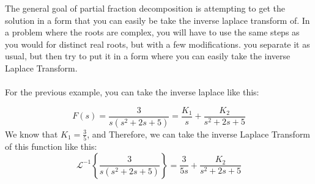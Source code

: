 \documentclass{article}
\theoremstyle{mytheoremstyle}
\theoremstyle{mytheoremstyle}
\theoremstyle{myproblemstyle}
\theoremstyle{break}
\newcommand{\LaplaceInverse}{\mathscr{L}^{-1}}
\begin{document}
The general goal of partial fraction decomposition is attempting to get the solution in a form that you can easily be take the inverse laplace transform of. In a problem where the roots are complex, you will have to use the same steps as you would for distinct real roots, but with a few modifications. you separate it as usual, but then try to put it in a form where you can easily take the inverse Laplace Transform.\\\\
For the previous example, you can take the inverse laplace like this:

\begin{equation}
	F(s) = \frac{3}{s(s^2 + 2s + 5)} = \frac{K_1}{s} + \frac{K_2}{s^2 + 2s + 5}
\end{equation}
We know that $K_1 = \frac{3}{5}$, and Therefore, we can take the inverse Laplace Transform of this function like this:
\begin{equation}
	\LaplaceInverse\left\{\frac{3}{s(s^2 + 2s + 5)}\right\} = \frac{3}{5s} + \frac{K_2}{s^2 + 2s + 5}
\end{equation}
\end{document}
